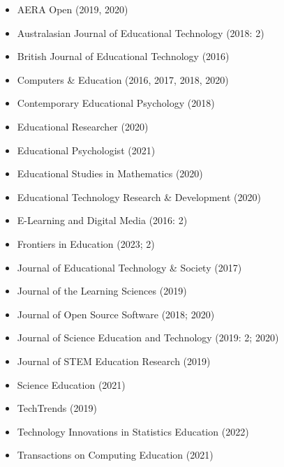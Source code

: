 \documentclass[
  14,
]{article}
\providecommand{\tightlist}{%
  \setlength{\itemsep}{0pt}\setlength{\parskip}{0pt}}
\begin{document}
\begin{itemize}
\tightlist
\item
  AERA Open (2019, 2020)\\
\item
  Australasian Journal of Educational Technology (2018: 2)\\
\item
  British Journal of Educational Technology (2016)\\
\item
  Computers \& Education (2016, 2017, 2018, 2020)\\
\item
  Contemporary Educational Psychology (2018)\\
\item
  Educational Researcher (2020)\\
\item
  Educational Psychologist (2021)\\
\item
  Educational Studies in Mathematics (2020)\\
\item
  Educational Technology Research \& Development (2020)\\
\item
  E-Learning and Digital Media (2016: 2)\\
\item
  Frontiers in Education (2023; 2)\\
\item
  Journal of Educational Technology \& Society (2017)\\
\item
  Journal of the Learning Sciences (2019)\\
\item
  Journal of Open Source Software (2018; 2020)\\
\item
  Journal of Science Education and Technology (2019: 2; 2020)\\
\item
  Journal of STEM Education Research (2019)\\
\item
  Science Education (2021)\\
\item
  TechTrends (2019)\\
\item
  Technology Innovations in Statistics Education (2022)\\
\item
  Transactions on Computing Education (2021)
\end{itemize}
\end{document}
